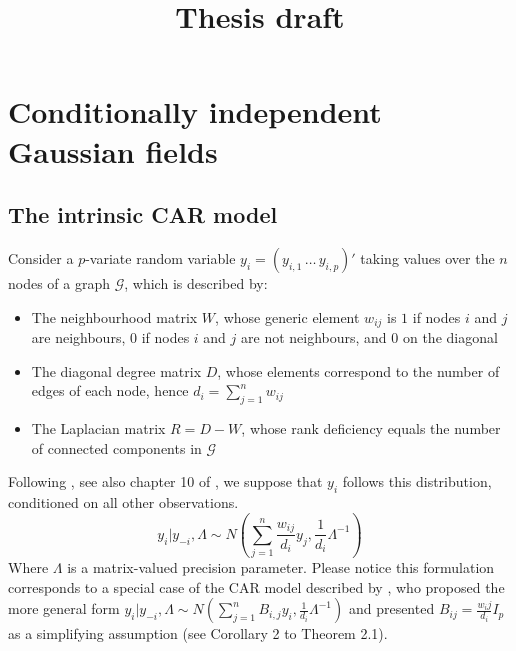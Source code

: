 \documentclass{article}
\title{Thesis draft}
\begin{document}
\maketitle


\section{Conditionally independent Gaussian fields}



\subsection{The intrinsic CAR model}

Consider a $p$-variate random variable $y_i = (y_{i,1}   \, \ldots \, y_{i,p})'$ taking values over the $n$ nodes of a graph $\mathcal{G}$, which is described by:
\begin{itemize}
\item The neighbourhood matrix $W$, whose generic element $w_{ij}$ is $1$ if nodes $i$ and $j$ are neighbours, $0$ if nodes $i$ and $j$ are not neighbours, and $0$ on the diagonal
\item The diagonal degree matrix $D$, whose elements correspond to the number of edges of each node, hence $d_i = \sum_{j=1}^{n} w_{ij}$
\item The Laplacian matrix $R = D - W$, whose rank deficiency equals the number of connected components in $\mathcal{G}$
\end{itemize}

Following \cite{Mardia}, see also chapter 10 of \cite{Banerjee}, we suppose that $y_i$ follows this distribution, conditioned on all other observations. 
$$
y_i | y_{-i}, \Lambda \sim N \left(\sum_{j=1}^{n} \frac{w_{ij}}{d_i}y_{j}, \frac{1}{d_i} \Lambda^{-1}\right)
$$
Where $\Lambda$ is a matrix-valued precision parameter. Please notice this formulation corresponds to a special case of the CAR model described by \cite{Mardia}, who proposed the more general form $y_i | y_{-i}, \Lambda \sim N \left(\sum_{j=1}^{n} B_{i,j} y_{i}, \frac{1}{d_i} \Lambda^{-1}\right)$ and presented $B_{ij} = \frac{w_ij}{d_i} I_p$ as a simplifying assumption (see Corollary 2 to Theorem 2.1). 
\end{document}
